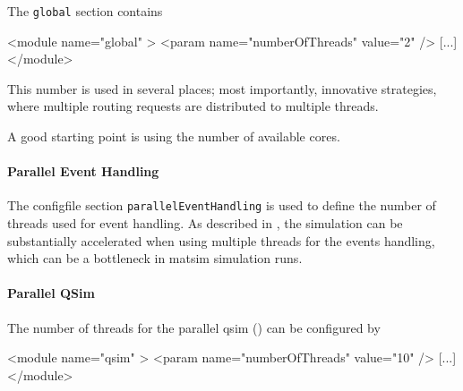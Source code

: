 The \lstinline{global} section contains
\begin{xml}
<module name="global" >
    <param name="numberOfThreads" value="2" />
    [...]
</module>
\end{xml}
This number is used in several places; most importantly, innovative strategies, where multiple routing requests are distributed to multiple threads.

A good starting point is using the number of available cores.

\paragraph{Parallel Event Handling}
\label{sec:using-paralleleventhandling}

The \gls{configfile} section \lstinline|parallelEventHandling| is used to define the number of threads used for event handling. 
As described in \citet[][]{WaraichEtAl_TechRep_IVT_2009, WaraichEtAl_STRC_2009}, the simulation can be substantially accelerated when using multiple threads for the events handling, which can be a bottleneck in \gls{matsim} simulation runs.


\paragraph{Parallel QSim}

The number of threads for the parallel \gls{qsim} (\cf \cite{Dobler_PhDThesis_2013}) can be configured by
\begin{xml}
<module name="qsim" >
    <param name="numberOfThreads" value="10" />
    [...]
</module>
\end{xml}


